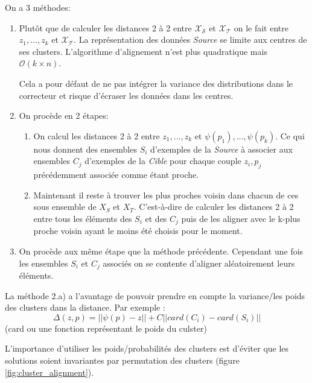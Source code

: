 On a 3 méthodes:
\begin{enumerate}
    \item Plutôt que de calculer les distances 2 à 2 entre $\mathcal{X_S}$ et
    $\mathcal{X_T}$ on le fait entre ${z_1,...,z_k}$ et $\mathcal{X_T}$. 
    La représentation des données \emph{Source} se limite aux centres de ses 
    clusters. L'algorithme d'alignement n'est plus quadratique mais 
    $\mathcal{O} (k\times n)$.

    Cela a pour défaut de ne pas intégrer la variance des distributions dans le
    correcteur et risque d'écraser les données dans les centres.

    \item On procède en 2 étapes:
    \begin{enumerate}
        \item On calcul les distances 2 à 2 entre ${z_1,...,z_k}$ et
        ${\psi(p_1),...,\psi(p_k)}$.
        Ce qui nous donnent des ensembles $S_i$ d'exemples de la \emph{Source} à 
        associer aux ensembles $C_j$ d'exemples de la \emph{Cible} pour chaque couple 
        $z_i,p_j$ précédemment associée comme étant proche.

        \item Maintenant il reste à trouver les plus proches voisin dans chacun de ces
        sous ensemble de $X_S$ et $X_T$. C'est-à-dire de calculer les distances 2 à 2
        entre tous les éléments des $S_i$ et des $C_j$ puis de les aligner avec le k-plus
        proche voisin ayant le moins été choisis pour le moment. 
    \end{enumerate}

    \item On procède aux même étape que la méthode précédente. Cependant une fois les 
    ensembles $S_i$ et $C_j$ associés on se contente d'aligner aléatoirement leurs éléments.

\end{enumerate}


La méthode 2.a) a l'avantage de pouvoir prendre en compte la variance/les poids
des clusters dans la distance. Par exemple :
$$\Delta(z, p) = ||\psi(p) - z|| + C||card(C_i)-card(S_i)||$$
(card ou une fonction représentant le poids du culster)

L'importance d'utiliser les poids/probabilités des clusters est d'éviter que 
les solutions soient invariantes par permutation des clusters 
(figure \ref{fig:cluster_alignment}).


